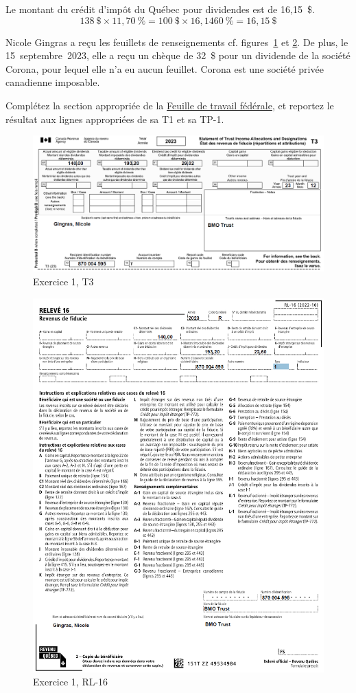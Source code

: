 Le montant du crédit d'impôt du Québec pour dividendes est de 16,15~\$.
\[ 138~\$ \times 11,70~\% = 100~\$ \times 16,1460~\% =  16,15~\$ \]
\begin{question}
	Nicole Gingras a reçu les feuillets de renseignements cf. figures~\ref{fig:chap6Exercice1T3} et \ref{fig:chap6Exercice1RL16}. De plus, le 15~septembre~2023, elle a reçu un chèque de 32~\$ pour un dividende de la société Corona, pour lequel elle n'a eu aucun feuillet. Corona est une société privée canadienne imposable.
	
	Complétez la section appropriée de la \href{https://www.canada.ca/fr/agence-revenu/services/formulaires-publications/trousses-impot-toutes-annees-imposition/trousse-generale-impot-prestations/5000-d1.html}{Feuille de travail fédérale}, et reportez le résultat aux lignes appropriées de sa T1 et sa TP-1.
	\begin{figure}
		\centering
		\includegraphics[width=.9\textwidth]{exercice/6-1/Q2/T3.png}
		\caption[]{Exercice 1, T3}
		\label{fig:chap6Exercice1T3}
	\end{figure}
	\begin{figure}
		\centering
		\includegraphics[width=.9\textwidth]{exercice/6-1/Q2/RL16.png}
		\caption[]{Exercice 1, RL-16}
		\label{fig:chap6Exercice1RL16}
	\end{figure}
\end{question}
